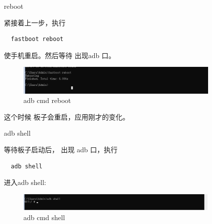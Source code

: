 \begin{frame}[fragile]{reboot}

紧接着上一步，执行
  \begin{lstlisting}
  fastboot reboot
  \end{lstlisting}
使手机重启。然后等待 出现adb 口。


  \begin{figure}[htbp]
  \begin{center}
  \includegraphics[width=10cm]{img/reboot}
  \caption{adb cmd reboot}
  \label{adb cmd reboot}
  \end{center}
  \vspace{-0.5em}
  \end{figure}

这个时候 板子会重启，应用刚才的变化。

\end{frame}




\begin{frame}[fragile]{adb shell}

等待板子启动后， 出现 adb 口，执行
  \begin{lstlisting}
  adb shell
  \end{lstlisting}
进入adb shell:


  \begin{figure}[htbp]
  \begin{center}
  \includegraphics[width=10cm]{img/shell}
  \caption{adb cmd shell}
  \label{adb cmd shell}
  \end{center}
  \vspace{-0.5em}
  \end{figure}

\end{frame}


